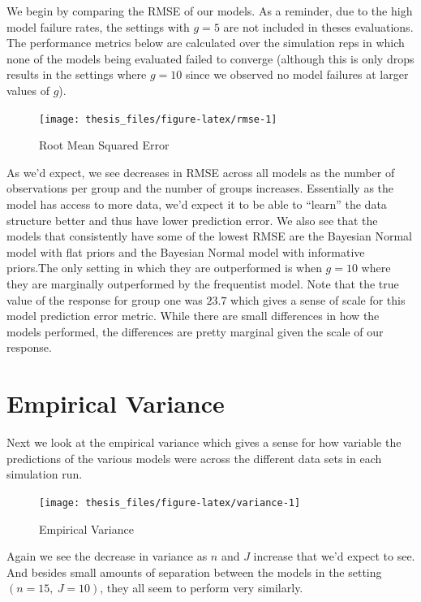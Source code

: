 \documentclass[12pt,twoside]{reedthesis}
\begin{document}
We begin by comparing the RMSE of our models. As a reminder, due to the high model failure rates, the settings with \(g = 5\) are not included in theses evaluations. The performance metrics below are calculated over the simulation reps in which none of the models being evaluated failed to converge (although this is only drops results in the settings where \(g = 10\) since we observed no model failures at larger values of \(g\)).
\begin{figure}

{\centering \texttt{[image: thesis\_files/figure-latex/rmse-1]} 

}

\caption{Root Mean Squared Error}\label{fig:rmse}
\end{figure}
As we'd expect, we see decreases in RMSE across all models as the number of observations per group and the number of groups increases. Essentially as the model has access to more data, we'd expect it to be able to ``learn'' the data structure better and thus have lower prediction error. We also see that the models that consistently have some of the lowest RMSE are the Bayesian Normal model with flat priors and the Bayesian Normal model with informative priors.The only setting in which they are outperformed is when \(g = 10\) where they are marginally outperformed by the frequentist model. Note that the true value of the response for group one was \(23.7\) which gives a sense of scale for this model prediction error metric. While there are small differences in how the models performed, the differences are pretty marginal given the scale of our response.

\hypertarget{empirical-variance}{%
\section{Empirical Variance}\label{empirical-variance}}

Next we look at the empirical variance which gives a sense for how variable the predictions of the various models were across the different data sets in each simulation run.
\begin{figure}

{\centering \texttt{[image: thesis\_files/figure-latex/variance-1]} 

}

\caption{Empirical Variance}\label{fig:variance}
\end{figure}
Again we see the decrease in variance as \(n\) and \(J\) increase that we'd expect to see. And besides small amounts of separation between the models in the setting \((n = 15, \ J = 10)\), they all seem to perform very similarly.
\end{document}
